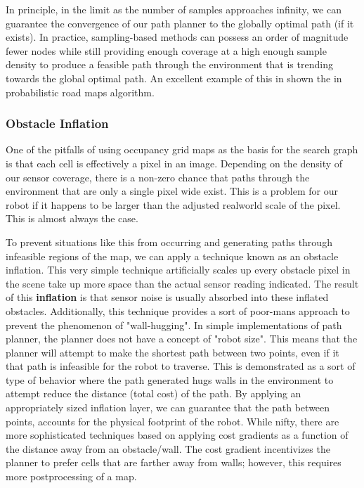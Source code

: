 In principle, in the limit as the number of samples approaches infinity, we can guarantee the convergence of our path planner to the globally optimal path (if it exists). In practice, sampling-based methods can possess an order of magnitude fewer nodes while still providing enough coverage at a high enough sample density to produce a feasible  path through the environment that is trending towards the global optimal path. An excellent example of this in shown the in probabilistic road maps algorithm. 

\subsubsection{Obstacle Inflation}

One of the pitfalls of using occupancy grid maps as the basis for the search graph is that each cell is effectively a pixel in an image. Depending on the density of our sensor coverage, there is a non-zero chance that paths through the environment that are only a single pixel wide exist. This is a problem for our robot if it happens to be larger than the adjusted realworld scale of the pixel. This is almost always the case. 

To prevent situations like this from occurring and generating paths through infeasible regions of the map, we can apply a technique known as an obstacle inflation. This very simple technique artificially scales up every obstacle pixel in the scene take up more space than the actual sensor reading indicated. The result of this \textbf{inflation} is that sensor noise is usually absorbed into these inflated obstacles. Additionally, this technique provides a sort of poor-mans approach to prevent the phenomenon of "wall-hugging". In simple implementations of path planner, the planner does not have a concept of "robot size". This means that the planner will attempt to make the shortest path between two points, even if it that path is infeasible for the robot to traverse. This is demonstrated as a sort of type of behavior where the path generated hugs walls in the environment to attempt reduce the distance (total cost) of the path. By applying an appropriately sized inflation layer, we can guarantee that the path between points, accounts for the physical footprint of the robot. While nifty, there are more sophisticated techniques based on applying cost gradients as a function of the distance away from an obstacle/wall. The cost gradient incentivizes the planner to prefer cells that are farther away from walls; however, this requires more postprocessing of a map. 